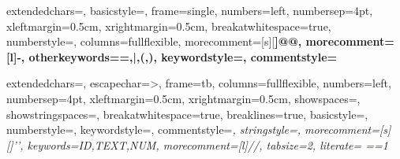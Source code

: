 \usepackage{xcolor}



{
		extendedchars=\true,
    basicstyle=\sffamily\scriptsize,
		frame=single,
		numbers=left, %
    numbersep=4pt, %
		xleftmargin=0.5cm,
		xrightmargin=0.5cm,
		breakatwhitespace=true,         %
    numberstyle=\small\color{gray}, %
    columns=fullflexible,
    morecomment=[s][\color{blue}\bfseries]{@}{@},
    morecomment=[l]{-},
    otherkeywords={=,|,(,)},
    keywordstyle={\color{brown}\bfseries},
    commentstyle=\color{gray}\itshape
}

%
{%
		extendedchars=\true,
		escapechar=>, %
		frame=tb, %
    columns=fullflexible,
		numbers=left, %
    numbersep=4pt, %
		xleftmargin=0.5cm,
		xrightmargin=0.5cm,
		showspaces=\false,
		showstringspaces=\false,
		breakatwhitespace=true,         %
		breaklines=true,                 %
		basicstyle=\color{black}\small\sffamily,
    numberstyle=\footnotesize\color{gray}, %
    keywordstyle={\color{black}\bfseries},
		commentstyle=\color{gray}\itshape, %
		stringstyle=\color{orange}, %
    morecomment=[s][\color{blue}]{'}{'},
		keywords={ID,TEXT,NUM},%
    morecomment=[l]{//},
		tabsize=2,
		literate=
		{=}{\textcolor{blue}{=}\bfseries}1%
}

